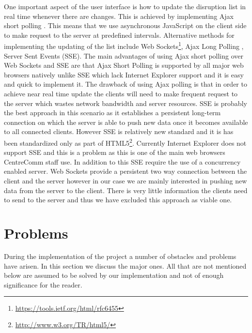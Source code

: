 One important aspect of the user interface is how to update the disruption list in real time whenever there are changes. This is achieved by implementing Ajax short polling \cite{bozdag2007comparison}. This means that we use asynchronous JavaScript on the client side to make request to the server at predefined intervals. Alternative methods for implementing the updating of the list include Web Sockets\footnote{\url{https://tools.ietf.org/html/rfc6455}}, Ajax Long Polling \cite{bozdag2007comparison}, Server Sent Events (SSE)\cite{serverSentEvents}. The main advantages of using Ajax short polling over Web Sockets and SSE are that Ajax Short Polling is supported by all major web browsers natively unlike SSE which lack Internet Explorer support and it is easy and quick to implement it. The drawback of using Ajax polling is that in order to achieve near real time update the clients will need to make frequent request to the server which wastes network bandwidth and server resources. SSE is probably the best approach in this scenario as it establishes a persistent long-term connection on which the server is able to push new data once it becomes available to all connected clients. However SSE is relatively new standard and it is has been standardized only as part of HTML5\footnote{\url{http://www.w3.org/TR/html5/}}. Currently Internet Explorer does not support SSE and this is a problem as this is one of the main web browsers CentreComm staff use. In addition to this SSE require the use of a concurrency enabled server. Web Sockets provide a persistent two way connection between the client and the server however in our case we are mainly interested in pushing new data from the server to the client. There is very little information the clients need to send to the server and thus we have excluded this approach as viable one.

\section{Problems}
During the implementation of the project a number of obstacles and problems have arisen. In this section we discuss the major ones. All that are not mentioned below are assumed to be solved by our implementation and not of enough significance for the reader.

